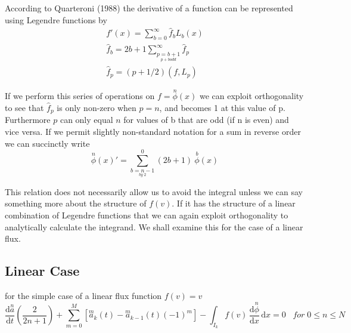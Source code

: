 \documentclass[letterpaper]{article}
\begin{document}
According to Quarteroni (1988) the derivative of a function can be represented using Legendre functions by
	\begin{gather*}\label{DerivativeLeg}
	f'(x) = \sum_{b=0}^\infty \hat{f}_b L_b(x)\\
	\hat{f}_b = 2b+1 \sum_{\underset{p+b odd}{p=b+1}}^\infty \hat{f}_p\\
	\hat{f}_p = (p+1/2) (f,L_p)
	\end{gather*}

If we perform this series of operations on $f=\overset{n}{\phi}(x)$ we can exploit orthogonality to see that $\hat{f}_p$ is only non-zero when $p=n$, and becomes 1 at this value of p. Furthermore $p$ can only equal $n$ for values of b that are odd (if n is even) and vice versa. If we permit slightly non-standard notation for a sum in reverse order we can succinctly write
	\begin{equation}\label{WeakFormNumFlux}
	\overset{n}{\phi}(x)' = \sum_{\underset{by \; 2}{b=n-1}}^0 (2b+1) \:\overset{b}{\phi}(x)
	\end{equation}

This relation does not necessarily allow us to avoid the integral unless we can say something more about the structure of $f(v)$. If it has the structure of a linear combination of Legendre functions that we can again exploit orthogonality to analytically calculate the integrand. We shall examine this for the case of a linear flux.
\subsection{Linear Case}
for the simple case of a linear flux function $f(v) = v$
	\begin{equation}\label{WFLinearIntermed}
	\frac{\mathrm{d}\overset{n}{a}}{\mathrm{d} t}\left(\frac{2}{2n+1}\right) + 
	\sum_{m=0}^M \left[ \overset{m}{a}_k(t) - \overset{m}{a}_{k-1}(t)(-1)^m \right] -
	\int_{I_k}\! f(v) \,\frac{\mathrm{d} \overset{n}{\phi}}{\mathrm{d}x} \,\mathrm{d}x = 0 \;\;\; for \; 0 \leq n \leq N
	\end{equation}
\end{document}
